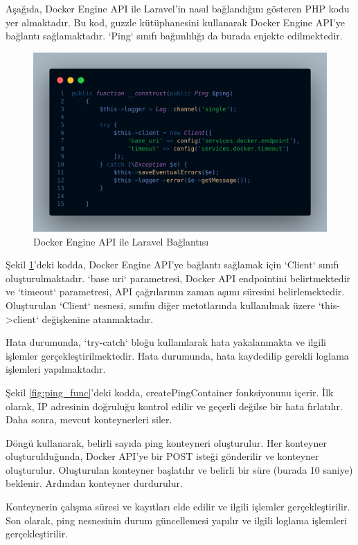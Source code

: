 Aşağıda, Docker Engine API ile Laravel'in nasıl bağlandığını gösteren PHP kodu yer almaktadır. Bu kod, guzzle\cite{guzzle_documentation} kütüphanesini kullanarak Docker Engine API'ye bağlantı sağlamaktadır. `Ping` sınıfı bağımlılığı da burada enjekte edilmektedir.

\begin{figure}[ht]
	\centering
	\includegraphics[width=0.7\linewidth]{images/code_construct.png}
	\caption{Docker Engine API ile Laravel Bağlantısı}
	\label{fig:ping_construct}
\end{figure}

Şekil \ref{fig:ping_construct}'deki kodda, Docker Engine API'ye bağlantı sağlamak için `Client` sınıfı oluşturulmaktadır. `base uri` parametresi, Docker API endpointini belirtmektedir ve `timeout` parametresi, API çağrılarının zaman aşımı süresini belirlemektedir. Oluşturulan `Client` nesnesi, sınıfın diğer metotlarında kullanılmak üzere `this->client` değişkenine atanmaktadır.

Hata durumunda, `try-catch` bloğu kullanılarak hata yakalanmakta ve ilgili işlemler gerçekleştirilmektedir. Hata durumunda, hata kaydedilip gerekli loglama işlemleri yapılmaktadır.

Şekil \ref{fig:ping_func}'deki kodda, createPingContainer fonksiyonunu içerir. İlk olarak, IP adresinin doğruluğu kontrol edilir ve geçerli değilse bir hata fırlatılır. Daha sonra, mevcut konteynerleri siler.

Döngü kullanarak, belirli sayıda ping konteyneri oluşturulur. Her konteyner oluşturulduğunda, Docker API'ye bir POST isteği gönderilir ve konteyner oluşturulur. Oluşturulan konteyner başlatılır ve belirli bir süre (burada 10 saniye) beklenir. Ardından konteyner durdurulur.

Konteynerin çalışma süresi ve kayıtları elde edilir ve ilgili işlemler gerçekleştirilir. Son olarak, ping nesnesinin durum güncellemesi yapılır ve ilgili loglama işlemleri gerçekleştirilir.

